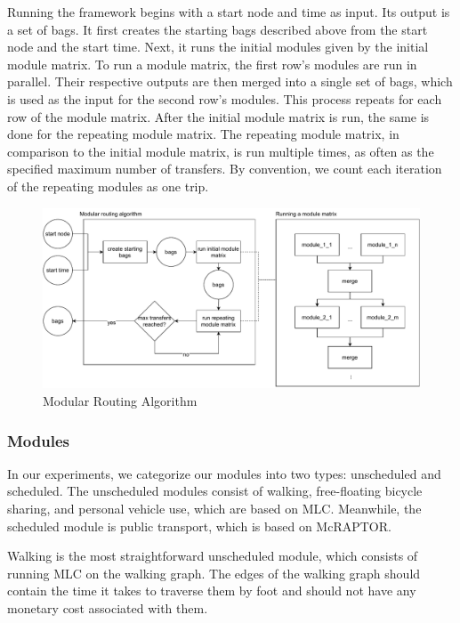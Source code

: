 Running the framework begins with a start node and time as input.
Its output is a set of bags.
It first creates the starting bags described above from the start node and the start time.
Next, it runs the initial modules given by the initial module matrix.
To run a module matrix, the first row's modules are run in parallel.
Their respective outputs are then merged into a single set of bags, which is used as the input for the second row's modules.
This process repeats for each row of the module matrix.
After the initial module matrix is run, the same is done for the repeating module matrix.
The repeating module matrix, in comparison to the initial module matrix, is run multiple times, as often as the specified maximum number of transfers.
By convention, we count each iteration of the repeating modules as one trip.

\begin{figure}
    \centering
    \includegraphics[scale=0.40]{Figures/method/modular_routing_algorithm}
    \caption{Modular Routing Algorithm}
    \label{fig:modular_routing_algorithm}
\end{figure}


\subsubsection{Modules}
\label{subsubsec:modules}

In our experiments, we categorize our modules into two types: unscheduled and scheduled. 
The unscheduled modules consist of walking, free-floating bicycle sharing, and personal vehicle use, which are based on MLC. Meanwhile, the scheduled module is public transport, which is based on McRAPTOR.

Walking is the most straightforward unscheduled module, which consists of running MLC on the walking graph.
The edges of the walking graph should contain the time it takes to traverse them by foot and should not have any monetary cost associated with them.

